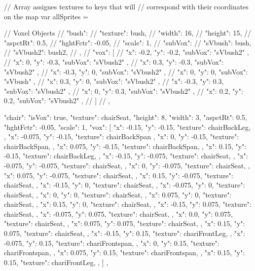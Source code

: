 // Array assignes textures to keys that will
// correspond with their coordinates on the map
var allSprites = {

  // Voxel Objects
  // "bush": {
  //   "texture": bush,
  //   "width": 16,
  //   "height": 15,
  //   "aspctRt": 0.5,
  //   "hghtFctr": -0.05,
  //   "scale": 1,
  //   "subVox": {
  //     "sVbush": bush,
  //     "sVbush2": bush2,
  //   },
  //   "vox": [
  //     { "x": -0.2, "y": -0.2, "subVox": "sVbush2" },
  //     { "x": 0, "y": -0.3, "subVox": "sVbush2" },
  //     { "x": 0.3, "y": -0.3, "subVox": "sVbush2" },
  //     { "x": -0.3, "y": 0, "subVox": "sVbush2" },
  //     { "x": 0, "y": 0, "subVox": "sVbush" },
  //     { "x": 0.3, "y": 0, "subVox": "sVbush2" },
  //     { "x": -0.3, "y": 0.3, "subVox": "sVbush2" },
  //     { "x": 0, "y": 0.3, "subVox": "sVbush2" },
  //     { "x": 0.2, "y": 0.2, "subVox": "sVbush2" },
  //   ]
  // },  

  "chair": {
    "isVox": true,
    "texture": chairSeat,
    "height": 8,
    "width": 3,
    "aspctRt": 0.5,
    "hghtFctr": -0.05,
    "scale": 1,
    "vox": [
      { "x": -0.15, "y": -0.15, "texture": chairBackLeg, },
      { "x": -0.075, "y": -0.15, "texture": chairBackSpan },
      { "x": 0,    "y": -0.15, "texture": chairBackSpan, },
      { "x": 0.075,  "y": -0.15, "texture": chairBackSpan, },
      { "x": 0.15,  "y": -0.15, "texture": chairBackLeg, },
      { "x": -0.15,   "y": -0.075, "texture": chairSeat, },
      { "x": -0.075,   "y": -0.075, "texture": chairSeat, },
      { "x": 0,      "y": -0.075, "texture": chairSeat, },
      { "x": 0.075,    "y": -0.075, "texture": chairSeat, },
      { "x": 0.15,    "y": -0.075, "texture": chairSeat, },
      { "x": -0.15,  "y": 0, "texture": chairSeat, },
      { "x": -0.075,  "y": 0, "texture": chairSeat, },
      { "x": 0,     "y": 0, "texture": chairSeat, },
      { "x": 0.075,   "y": 0, "texture": chairSeat, },
      { "x": 0.15,   "y": 0, "texture": chairSeat, },
      { "x": -0.15,  "y": 0.075, "texture": chairSeat, },
      { "x": -0.075,  "y": 0.075, "texture": chairSeat, },
      { "x": 0.0,   "y": 0.075, "texture": chairSeat, },
      { "x": 0.075,   "y": 0.075, "texture": chairSeat, },
      { "x": 0.15,   "y": 0.075, "texture": chairSeat, },
      { "x": -0.15, "y": 0.15, "texture": chariFrontLeg, },
      { "x": -0.075, "y": 0.15, "texture": chariFrontspan, },
      { "x": 0,    "y": 0.15, "texture": chariFrontspan, },
      { "x": 0.075,  "y": 0.15, "texture": chariFrontspan, },
      { "x": 0.15,  "y": 0.15, "texture": chariFrontLeg, },
    ]
  },  


}
